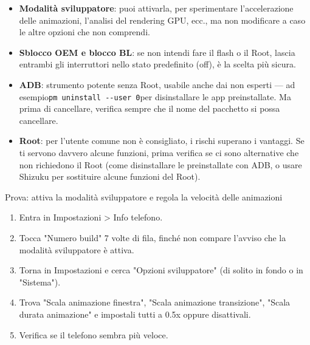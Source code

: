 
\begin{itemize}
  \item \textbf{Modalità sviluppatore}: puoi attivarla, per sperimentare l'accelerazione delle animazioni, l'analisi del rendering GPU, ecc., ma non modificare a caso le altre opzioni che non comprendi.
  \item \textbf{Sblocco OEM e blocco BL}: se non intendi fare il flash o il Root, lascia entrambi gli interruttori nello stato predefinito (off), è la scelta più sicura.
  \item \textbf{ADB}: strumento potente senza Root, usabile anche dai non esperti — ad esempio\texttt{pm uninstall -\allowbreak -\allowbreak user 0}per disinstallare le app preinstallate. Ma prima di cancellare, verifica sempre che il nome del pacchetto si possa cancellare.
  \item \textbf{Root}: per l'utente comune non è consigliato, i rischi superano i vantaggi. Se ti servono davvero alcune funzioni, prima verifica se ci sono alternative che non richiedono il Root (come disinstallare le preinstallate con ADB, o usare Shizuku per sostituire alcune funzioni del Root).
\end{itemize}

\begin{tcbpractice}{Prova: attiva la modalità sviluppatore e regola la velocità delle animazioni}
\begin{enumerate}
  \item Entra in Impostazioni > Info telefono.
  \item Tocca "Numero build" 7 volte di fila, finché non compare l'avviso che la modalità sviluppatore è attiva.
  \item Torna in Impostazioni e cerca "Opzioni sviluppatore" (di solito in fondo o in "Sistema").
  \item Trova "Scala animazione finestra", "Scala animazione transizione", "Scala durata animazione" e impostali tutti a 0.5x oppure disattivali.
  \item Verifica se il telefono sembra più veloce.
\end{enumerate}

\end{tcbpractice}
